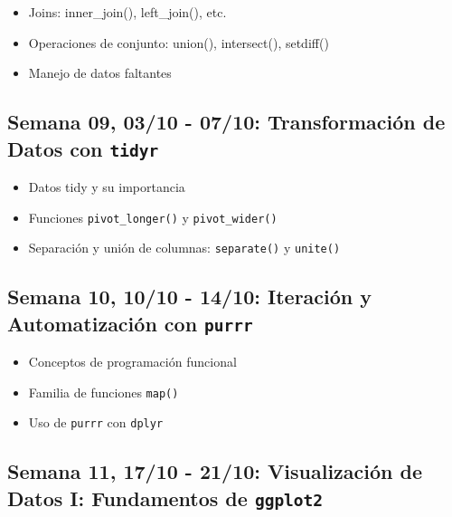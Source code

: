 \documentclass[11pt,letter,]{article}
\providecommand{\tightlist}{%
  \setlength{\itemsep}{0pt}\setlength{\parskip}{0pt}}
\begin{document}
\begin{itemize}
\tightlist
\item
  Joins: inner\_join(), left\_join(), etc.
\item
  Operaciones de conjunto: union(), intersect(), setdiff()
\item
  Manejo de datos faltantes
\end{itemize}

\hypertarget{semana-09-0310---0710-transformaciuxf3n-de-datos-con-tidyr}{%
\subsection{\texorpdfstring{Semana 09, 03/10 - 07/10: Transformación de
Datos con
\texttt{tidyr}}{Semana 09, 03/10 - 07/10: Transformación de Datos con tidyr}}\label{semana-09-0310---0710-transformaciuxf3n-de-datos-con-tidyr}}

\begin{itemize}
\tightlist
\item
  Datos tidy y su importancia
\item
  Funciones \texttt{pivot\_longer()} y \texttt{pivot\_wider()}
\item
  Separación y unión de columnas: \texttt{separate()} y \texttt{unite()}
\end{itemize}

\hypertarget{semana-10-1010---1410-iteraciuxf3n-y-automatizaciuxf3n-con-purrr}{%
\subsection{\texorpdfstring{Semana 10, 10/10 - 14/10: Iteración y
Automatización con
\texttt{purrr}}{Semana 10, 10/10 - 14/10: Iteración y Automatización con purrr}}\label{semana-10-1010---1410-iteraciuxf3n-y-automatizaciuxf3n-con-purrr}}

\begin{itemize}
\tightlist
\item
  Conceptos de programación funcional
\item
  Familia de funciones \texttt{map()}
\item
  Uso de \texttt{purrr} con \texttt{dplyr}
\end{itemize}

\hypertarget{semana-11-1710---2110-visualizaciuxf3n-de-datos-i-fundamentos-de-ggplot2}{%
\subsection{\texorpdfstring{Semana 11, 17/10 - 21/10: Visualización de
Datos I: Fundamentos de
\texttt{ggplot2}}{Semana 11, 17/10 - 21/10: Visualización de Datos I: Fundamentos de ggplot2}}\label{semana-11-1710---2110-visualizaciuxf3n-de-datos-i-fundamentos-de-ggplot2}}
\end{document}

